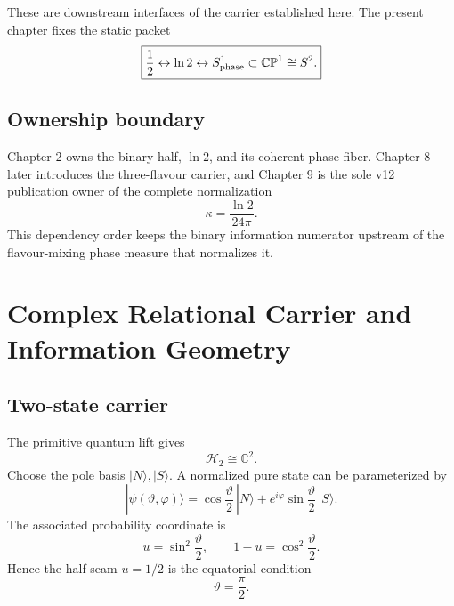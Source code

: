 These are downstream interfaces of the carrier established here. The present chapter fixes the static packet
\begin{equation}
\boxed{
\frac12
\leftrightarrow
\ln2
\leftrightarrow
S^1_{\rm phase}
\subset
\mathbb{CP}^1\cong S^2.
}
\end{equation}

\section{Ownership boundary}

Chapter 2 owns the binary half, $\ln2$, and its coherent phase fiber. Chapter 8 later introduces the three-flavour carrier, and Chapter 9 is the sole v12 publication owner of the complete normalization
\[
\kappa=\frac{\ln2}{24\pi}.
\]
This dependency order keeps the binary information numerator upstream of the flavour-mixing phase measure that normalizes it.

\clearpage

\chapter{Complex Relational Carrier and Information Geometry}
\label{ch:v12_complex_carrier}

\section{Two-state carrier}

The primitive quantum lift gives
\begin{equation}
\mathcal H_2\cong\mathbb C^2.
\end{equation}
Choose the pole basis $|N\rangle,|S\rangle$. A normalized pure state can be parameterized by
\begin{equation}
\boxed{
|\psi(\vartheta,\varphi)\rangle
=\cos\frac\vartheta2\,|N\rangle
+e^{i\varphi}\sin\frac\vartheta2\,|S\rangle.
}
\label{eq:v12_spinor_spherical}
\end{equation}
The associated probability coordinate is
\begin{equation}
u=\sin^2\frac\vartheta2,
\qquad
1-u=\cos^2\frac\vartheta2.
\end{equation}
Hence the half seam $u=1/2$ is the equatorial condition
\begin{equation}
\vartheta=\frac\pi2.
\end{equation}

